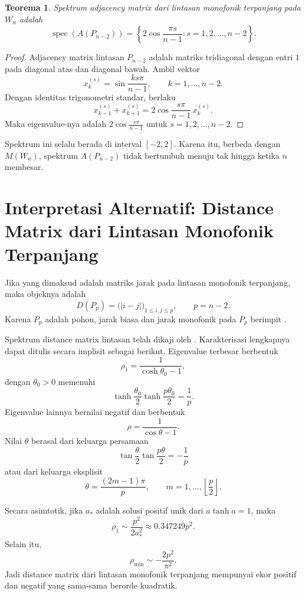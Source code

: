 \documentclass[12pt,a4paper]{article}
\newtheorem{teorema}{Teorema}
\theoremstyle{definition}
\newcommand{\spec}{\operatorname{spec}}
\begin{document}
\begin{teorema}
  Spektrum adjacency matrix dari lintasan monofonik terpanjang pada $W_n$ adalah
  \[
    \spec(A(P_{n-2}))=
    \left\{
    2\cos\frac{\pi s}{n-1}:s=1,2,\ldots,n-2
    \right\}.
  \]
  \label{thm:adj-path}
\end{teorema}

\begin{proof}
  Adjacency matrix lintasan $P_{n-2}$ adalah matriks tridiagonal dengan entri $1$ pada diagonal atas dan diagonal bawah. Ambil vektor
  \[
    x_k^{(s)}=\sin\frac{ks\pi}{n-1},\qquad k=1,\ldots,n-2.
  \]
  Dengan identitas trigonometri standar, berlaku
  \[
    x_{k-1}^{(s)}+x_{k+1}^{(s)}
    =
    2\cos\frac{s\pi}{n-1}\,x_k^{(s)}.
  \]
  Maka eigenvalue-nya adalah $2\cos\frac{s\pi}{n-1}$ untuk $s=1,2,\ldots,n-2$.
\end{proof}

Spektrum ini selalu berada di interval $[-2,2]$. Karena itu, berbeda dengan $M(W_n)$, spektrum $A(P_{n-2})$ tidak bertumbuh menuju tak hingga ketika $n$ membesar.

\section{Interpretasi Alternatif: Distance Matrix dari Lintasan Monofonik Terpanjang}

Jika yang dimaksud adalah matriks jarak pada lintasan monofonik terpanjang, maka objeknya adalah
\[
  D(P_p)=\bigl(|i-j|\bigr)_{1\le i,j\le p},\qquad p=n-2.
\]
Karena $P_p$ adalah pohon, jarak biasa dan jarak monofonik pada $P_p$ berimpit \citep{titus2017monophonic}.

Spektrum distance matrix lintasan telah dikaji oleh \citet{ruzieh1990distance}. Karakterisasi lengkapnya dapat ditulis secara implisit sebagai berikut. Eigenvalue terbesar berbentuk
\[
  \rho_1=\frac{1}{\cosh\theta_0-1},
\]
dengan $\theta_0>0$ memenuhi
\[
  \tanh\frac{\theta_0}{2}\tanh\frac{p\theta_0}{2}=\frac1p.
\]
Eigenvalue lainnya bernilai negatif dan berbentuk
\[
  \rho=\frac{1}{\cos\theta-1}.
\]
Nilai $\theta$ berasal dari keluarga persamaan
\[
  \tan\frac{\theta}{2}\tan\frac{p\theta}{2}=-\frac1p
\]
atau dari keluarga eksplisit
\[
  \theta=\frac{(2m-1)\pi}{p},\qquad m=1,\ldots,\left\lfloor\frac p2\right\rfloor.
\]

Secara asimtotik, jika $a_*$ adalah solusi positif unik dari $a\tanh a=1$, maka
\[
  \rho_1\sim \frac{p^2}{2a_*^2}\approx 0.347249p^2.
\]
Selain itu,
\[
  \rho_{\min}\sim -\frac{2p^2}{\pi^2}.
\]
Jadi distance matrix dari lintasan monofonik terpanjang mempunyai ekor positif dan negatif yang sama-sama berorde kuadratik.
\end{document}
